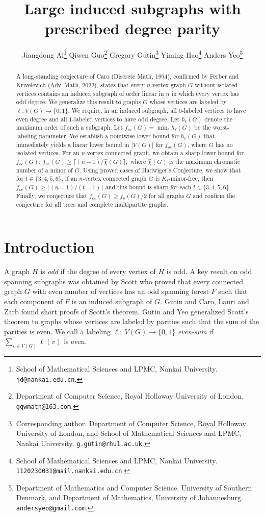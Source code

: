 \documentclass{article}
\title{Large induced subgraphs with prescribed degree parity}
\author{Jiangdong Ai\thanks{School of Mathematical Sciences and LPMC, Nankai University. {\tt jd@nankai.edu.cn}.}
\hspace{2mm}
Qiwen Guo\thanks{Department of Computer Science, Royal Holloway University of London. {\tt gqwmath@163.com}.}
\hspace{2mm}
Gregory Gutin\thanks{Corresponding author. Department of Computer Science, Royal Holloway University of London,  and School of Mathematical Sciences and LPMC, Nankai University. {\tt g.gutin@rhul.ac.uk}.}
\hspace{2mm} Yiming Hao\thanks{School of Mathematical Sciences and LPMC, Nankai University. {\tt  
1120230031@mail.nankai.edu.cn}.}
\hspace{2mm} Anders Yeo\thanks{Department of Mathematics and Computer Science, University of Southern Denmark, and Department of Mathematics, University of Johannesburg.   {\tt andersyeo@gmail.com}.}
}
\newcommand{\mchi}{\hat{\chi}}
\newcommand{\2}{\vspace{0.2cm}}
\begin{document}
\maketitle

\begin{abstract}
A long-standing conjecture of Caro (Discrete Math, 1994), confirmed by Ferber and Krivelevich (Adv\ Math, 2022), states that every $n$-vertex graph $G$ without isolated vertices contains an induced subgraph of order linear in $n$ in which every vertex has odd degree. We generalize this result to graphs $G$ whose vertices are labeled by $\ell: V(G)\to \{0,1\}$. We require, in an induced subgraph, all
$0$-labeled vertices to have even degree and all $1$-labeled vertices to have odd degree. Let $h_{\ell}(G)$ denote the maximum order of such a subgraph. 
Let $f_{oe}(G)=\min_{\ell} h_{\ell}(G)$ be the worst-labeling parameter. We establish a pointwise lower bound for $h_{\ell}(G)$ that immediately yields a linear lower bound in $|V(G)|$ for $f_{oe}(G)$, where $G$ has no isolated vertices. 
For an $n$-vertex connected graph, we obtain a sharp lower bound for $f_{oe}(G)$: 
$f_{oe}(G)\ge \lceil (n-1)/\mchi(G) \rceil ,$ where $\mchi(G)$ is the maximum chromatic number of a minor of $G.$ Using proved cases of Hadwiger's Conjecture, we show that for $t\in \{3,4,5,6\}$, if an $n$-vertex connected graph $G$ is $K_t$-minor-free, then $f_{oe}(G)\ge \lceil (n-1)/(t-1)\rceil$ and this bound is sharp for each $t\in \{3,4,5,6\}$. 
Finally, we conjecture that $f_{oe}(G)\ge f_o(G)/2$ for all graphs $G$ and confirm the conjecture for all trees and complete multipartite graphs.
\end{abstract}

\section{Introduction}

A graph $H$ is {\em odd} if the degree of every vertex of $H$ is odd. A key result on odd spanning subgraphs was obtained by 
Scott \cite{Scott2001} who proved that every connected graph $G$ with even number of vertices has an odd spanning forest $F$ such that
each component of $F$ is an induced subgraph of $G$. %
Gutin \cite{Gutin2016} and  Caro, Lauri and Zarb \cite{CLZ} found short proofs of
Scott's theorem. Gutin and Yeo \cite{GutinYeo2022} generalized Scott's theorem to graphs whose vertices are labeled by parities such that the sum of the parities is even.
We call a labeling $\ell:\ V(G)\to \{0,1\}$ {\em even-sum} if $\sum_{v\in V(G)}\ell(v)$ is even. 
\end{document}
